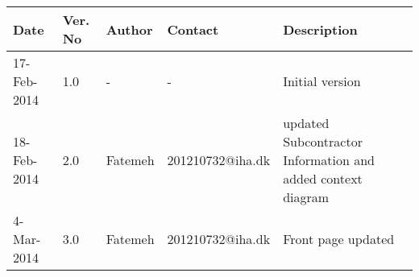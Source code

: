 \begin{center}
    \begin{tabular}{ | l | p{1cm} | l | l | p{5cm} |}
    \hline
    Date&Ver. No & Author &Contact &Description         									 \\ \hline
	17-Feb-2014&1.0 & - & - & Initial version                                         \\
	18-Feb-2014&2.0 & Fatemeh & 201210732@iha.dk & updated Subcontractor Information and added context diagram \\
    4-Mar-2014&3.0 & Fatemeh & 201210732@iha.dk & Front page updated\\
    \hline
    \end{tabular}
\end{center} 